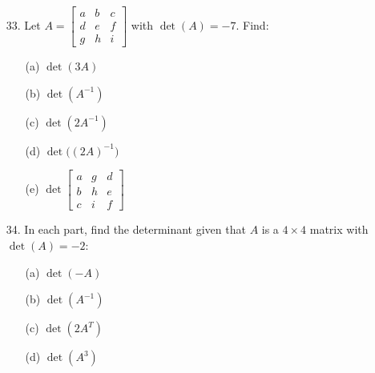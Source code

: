 \documentclass{article}
\theoremstyle{mystyle}
\begin{document}
\begin{enumerate}
\item[33.] Let $A=\begin{bmatrix}a&b&c\\d&e&f\\g&h&i\end{bmatrix}$ with $\det(A)=-7$.
Find:
\begin{enumerate}
  \item[(a)] $\det(3A)$
  \item[(b)] $\det(A^{-1})$
  \item[(c)] $\det(2A^{-1})$
  \item[(d)] $\det\bigl((2A)^{-1}\bigr)$
  \item[(e)] $\det\begin{bmatrix}a&g&d\\b&h&e\\c&i&f\end{bmatrix}$
\end{enumerate}

\item[34.] In each part, find the determinant given that $A$ is a $4\times 4$ matrix
with $\det(A)=-2$:
\begin{enumerate}
  \item[(a)] $\det(-A)$
  \item[(b)] $\det(A^{-1})$
  \item[(c)] $\det(2A^T)$
  \item[(d)] $\det(A^3)$
\end{enumerate}

\end{enumerate}
\end{document}
